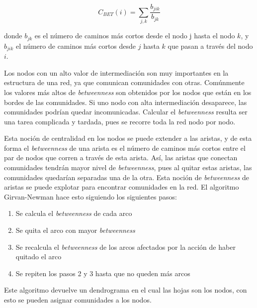 \documentclass{article}
\begin{document}
\begin{equation}
C_{BET}(i)=\sum_{j,k}\frac{b_{jik}}{b_{jk}} 
\end{equation}

donde $b_{jk}$ es el número de caminos más cortos desde el nodo j hasta el nodo $k$, y $b_{jik}$ el número de caminos más cortos desde $j$ hasta $k$ que pasan a través del nodo $i$.

Los nodos con un alto valor de intermediación son muy importantes en la estructura de una red, ya que comunican comunidades con otras. Comúnmente los valores más altos de \textit{betweenness} son obtenidos por los nodos que están en los bordes de las comunidades. Si uno nodo con alta intermediación desaparece, las comunidades podrían quedar incomunicadas. Calcular el \textit{betweenness} resulta ser una tarea complicada y tardada, pues se recorre toda la red nodo por nodo.


Esta noción de centralidad en los nodos se puede extender a las aristas, y de esta forma el \textit{betweenness} de una arista es el número de caminos más cortos entre el par de nodos que corren a través de esta arista. Así, las aristas que conectan comunidades tendrán mayor nivel de \textit{betweenness}, pues al quitar estas aristas, las comunidades quedarían separadas una de la otra. Esta noción de \textit{betweenness} de aristas se puede explotar para encontrar comunidades en la red. El algoritmo Girvan-Newman hace esto siguiendo los siguientes pasos:

\begin{enumerate}
\item Se calcula el \textit{betweenness} de cada arco
\item Se quita el arco con mayor \textit{betweenness}
\item Se recalcula el \textit{betweenness} de los arcos afectados por la acción de haber quitado el arco
\item Se repiten los pasos 2 y 3 hasta que no queden más arcos
\end{enumerate}

Este algoritmo devuelve un dendrograma en el cual las hojas son los nodos, con esto se pueden asignar comunidades a los nodos.
\end{document}
